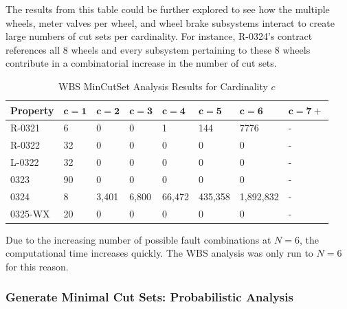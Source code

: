 The results from this table could be further explored to see how the multiple wheels, meter valves per wheel, and wheel brake subsystems interact to create large numbers of cut sets per cardinality. For instance, R-0324's contract references all 8 wheels and every subsystem pertaining to these 8 wheels contribute in a combinatorial increase in the number of cut sets. 


\begin{table}[h]
\begin{center}
    \begin{tabular}{ | l | l | l | l | l | l | l | l |}
    \hline
    \textbf{Property} & $\bm{c = 1}$ & $\bm{c = 2}$ & $\bm{c = 3}$ & $\bm{c = 4}$ 
		& $\bm{c = 5}$ & $\bm{c = 6}$ & $\bm{c = 7+}$  \\ \hline \hline
    R-0321 & 6 & 0 & 0 & 1& 144&7776 &- \\ \hline
    R-0322 & 32 & 0 & 0 &0 &0 &0 &- \\ \hline
    L-0322 & 32 & 0 & 0 &0 &0 &0 &- \\ \hline
    0323 & 90 & 0 & 0 &0 &0 &0 &- \\ \hline
    0324 & 8 & 3,401 & 6,800 &66,472 & 435,358&1,892,832 &- \\ \hline
    0325-WX & 20 & 0 & 0 &0 &0 & 0&- \\ \hline 
    \end{tabular}
    \vspace{0.1in}
    \caption{WBS MinCutSet Analysis Results for Cardinality $c$}
    \vspace{-0.3in}
    \label{tab:wbs_maxN_results}
\end{center}
\end{table}




Due to the increasing number of possible fault combinations at $N=6$, the computational time increases quickly. The WBS analysis was only run to $N=6$ for this reason.

\subsubsection{Generate Minimal Cut Sets: Probabilistic Analysis}
\label{sec:prob_generate}


